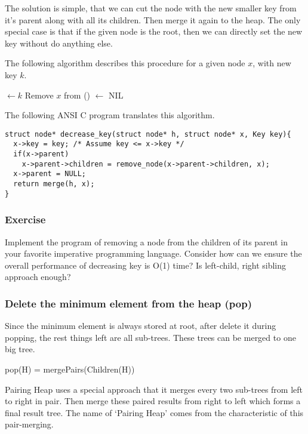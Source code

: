 \documentclass{article}
\begin{document}
The solution is simple, that we can cut the node with the new smaller
key from it's parent along with all its children. Then merge it again
to the heap. The only special case is that if the given node is the 
root, then we can directly set the new key without do anything else.

The following algorithm describes this procedure for a given node $x$, with
new key $k$.

\begin{algorithmic}
  \State {} $\gets k$
    \State Remove $x$ from ()
  \EndIf
   $\gets$ NIL
  \State \Return {}
\EndFunction
\end{algorithmic}

The following ANSI C program translates this algorithm.

\lstset{language=C}
\begin{lstlisting}
struct node* decrease_key(struct node* h, struct node* x, Key key){
  x->key = key; /* Assume key <= x->key */
  if(x->parent)
    x->parent->children = remove_node(x->parent->children, x);
  x->parent = NULL;
  return merge(h, x);
}
\end{lstlisting}

\subsubsection*{Exercise}
Implement the program of removing a node from the children of its
parent in your favorite imperative programming language. Consider
how can we ensure the overall performance of decreasing key is 
O(1) time? Is left-child, right sibling approach enough?

\subsubsection{Delete the minimum element from the heap (pop)}
Since the minimum element is always stored at root, after delete it
during popping, the rest things left are all sub-trees. These trees
can be merged to one big tree. 

\be
  pop(H) = mergePairs(Children(H))
\ee

Pairing Heap uses a special approach that it merges every two sub-trees 
from left to right in pair. Then
merge these paired results from right to left which forms a final
result tree. The name of `Pairing Heap' comes from the characteristic 
of this pair-merging.
\end{document}
